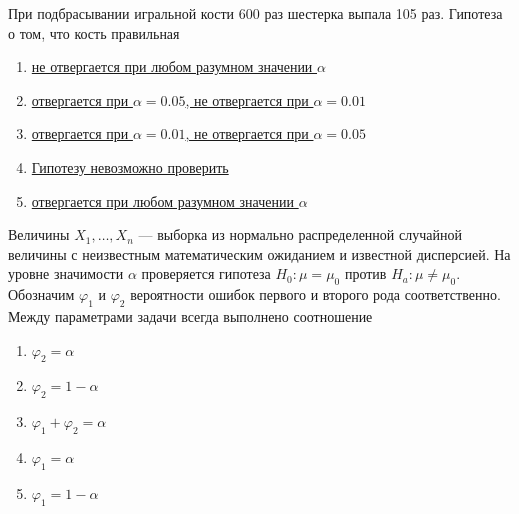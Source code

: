 \documentclass[t]{beamer}
\begin{document}
 \begin{frame} \label{13} 
\begin{block}{13} 

  При подбрасывании игральной кости 600 раз шестерка выпала 105 раз. Гипотеза о том, что кость правильная
  


 \end{block} 
\begin{enumerate} 
\item[] \hyperlink{13-Yes}{\beamergotobutton{} не отвергается при любом разумном значении $\alpha$}
\item[] \hyperlink{13-No}{\beamergotobutton{} отвергается при $\alpha = 0.05$, не отвергается при $\alpha = 0.01$}
\item[] \hyperlink{13-No}{\beamergotobutton{} отвергается при $\alpha = 0.01$, не отвергается при $\alpha = 0.05$}
\item[] \hyperlink{13-No}{\beamergotobutton{} Гипотезу невозможно проверить}
\item[] \hyperlink{13-No}{\beamergotobutton{} отвергается при любом разумном значении $\alpha$}
\end{enumerate} 
\end{frame} 


 \begin{frame} \label{14} 
\begin{block}{14} 

  Величины $X_1,\ldots,X_n$ — выборка из нормально распределенной случайной величины с неизвестным математическим ожиданием и известной дисперсией. На уровне значимости $\alpha$ проверяется гипотеза $H_0: \mu = \mu_0$ против $H_a: \mu \neq \mu_0$. Обозначим $\varphi_1$ и $\varphi_2$ вероятности ошибок первого и второго рода соответственно. Между параметрами задачи всегда выполнено соотношение
  


 \end{block} 
\begin{enumerate} 
\item[] \hyperlink{14-No}{\beamergotobutton{} $\varphi_2 = \alpha$}
\item[] \hyperlink{14-No}{\beamergotobutton{} $\varphi_2 = 1 - \alpha$}
\item[] \hyperlink{14-No}{\beamergotobutton{} $\varphi_1 + \varphi_2 = \alpha$}
\item[] \hyperlink{14-Yes}{\beamergotobutton{} $\varphi_1 = \alpha$}
\item[] \hyperlink{14-No}{\beamergotobutton{} $\varphi_1 = 1 - \alpha$}
\end{enumerate} 
\end{frame} 
\end{document}
